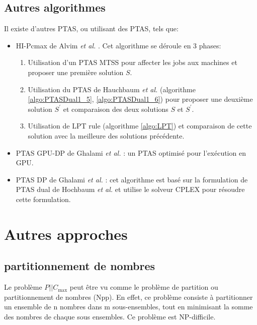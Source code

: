 \documentclass[a4paper,12pt]{report}
\theoremstyle{plain}				%
\theoremstyle{definition}				%
\newcommand\problemGrahamP{$P||C_{\max}$\xspace}
\begin{document}
\subsection{Autres algorithmes}

Il existe d'autres PTAS, ou utilisant des PTAS, tels que:
\begin{itemize}
\item HI-Pcmax de Alvim \emph{et al.} \cite{alvim2004hybrid}.
  Cet algorithme se déroule en 3 phases:
  \begin{enumerate}
  \item Utilisation d'un PTAS MTSS pour affecter les jobs aux machines
    et proposer une première solution $S$.
  \item Utilisation du PTAS de Hauchbaum \emph{et al.}
    (algorithme \ref{algo:PTASDual1_5}, \ref{algo:PTASDual1_6}) pour
    proposer une deuxième solution $S^\prime$
    et comparaison des deux solutions $S$ et $S^\prime$.
  \item Utilisation de LPT rule (algorithme \ref{algo:LPT}) et
    comparaison de cette solution avec la meilleure des solutions
    précédente.
  \end{enumerate}

\item PTAS GPU-DP de Ghalami \emph{et al.} \cite{li2018gpu}:
  un PTAS optimisé pour l'exécution en GPU.

\item PTAS DP de Ghalami \emph{et al.}
  \cite{ghalami2019scheduling}: cet algorithme est basé sur la
  formulation de PTAS dual de Hochbaum \emph{et al.}
  et utilise le solveur CPLEX pour résoudre cette formulation.
\end{itemize}


\section{Autres approches} \label{sec:autresApproches}

\subsection{partitionnement de nombres}
\label{ssec:autresApprochesPartitionnement}

Le problème \problemGrahamP peut être vu comme le problème de
partition ou partitionnement de nombres (Npp).
En effet, ce problème consiste à partitionner un ensemble de n nombres
dans m sous-ensembles, tout en minimisant la somme des nombres de
chaque sous ensembles.
Ce problème est NP-difficile.
\end{document}

